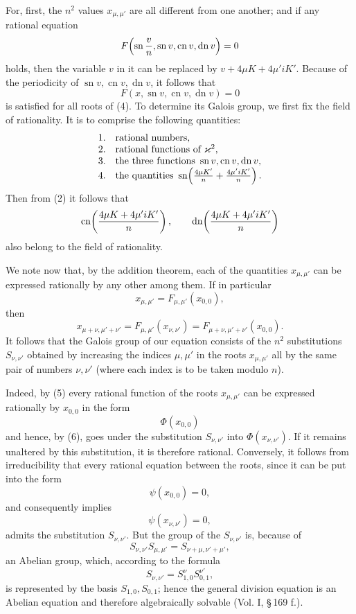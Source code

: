 \documentclass[11pt]{article}
\providecommand{\sn}{\operatorname{sn}}
\providecommand{\cn}{\operatorname{cn}}
\providecommand{\dn}{\operatorname{dn}}
\begin{document}
For, first, the $n^2$ values $x_{\mu,\mu'}$ are all different from one another; and if any
rational equation
\[
F\!\left(\sn {v\over n},\sn v,\cn v,\dn v\right)=0
\]
holds, then the variable $v$ in it can be replaced by $v+4\mu K+4\mu'iK'$. Because of the
periodicity of $\sn v,\cn v,\dn v$, it follows that
\[
F(x,\sn v,\cn v,\dn v)=0
\]
is satisfied for all roots of (4). To determine its Galois group, we first fix the field of
rationality. It is to comprise the following quantities:
\[
\begin{array}{ll}
1.& \text{rational numbers,}\\
2.& \text{rational functions of }\varkappa^2,\\
3.& \text{the three functions }\sn v,\cn v,\dn v,\\
4.& \text{the quantities }\sn\!\left({4\mu K'\over n}+{4\mu'iK'\over n}\right).
\end{array}
\]
Then from (2) it follows that
\[
\cn\!\left({4\mu K+4\mu'iK'\over n}\right),\qquad
\dn\!\left({4\mu K+4\mu'iK'\over n}\right)
\]
also belong to the field of rationality.

We note now that, by the addition theorem, each of the quantities $x_{\mu,\mu'}$ can be
expressed rationally by any other among them. If in particular
\begin{equation}
x_{\mu,\mu'}=F_{\mu,\mu'}(x_{0,0}),
\tag{5}
\end{equation}
then
\begin{equation}
x_{\mu+\nu,\mu'+\nu'}=F_{\mu,\mu'}(x_{\nu,\nu'})
=F_{\mu+\nu,\mu'+\nu'}(x_{0,0}).
\tag{6}
\end{equation}
It follows that the Galois group of our equation consists of the $n^2$ substitutions
$S_{\nu,\nu'}$ obtained by increasing the indices $\mu,\mu'$ in the roots $x_{\mu,\mu'}$
all by the same pair of numbers $\nu,\nu'$ (where each index is to be taken modulo $n$).

Indeed, by (5) every rational function of the roots $x_{\mu,\mu'}$ can be expressed
rationally by $x_{0,0}$ in the form
\[
\Phi(x_{0,0})
\]
and hence, by (6), goes under the substitution $S_{\nu,\nu'}$ into $\Phi(x_{\nu,\nu'})$.
If it remains unaltered by this substitution, it is therefore rational. Conversely, it follows
from irreducibility that every rational equation between the roots, since it can be put into
the form
\[
\psi(x_{0,0})=0,
\]
and consequently implies
\[
\psi(x_{\nu,\nu'})=0,
\]
admits the substitution $S_{\nu,\nu'}$. But the group of the $S_{\nu,\nu'}$ is, because of
\[
S_{\nu,\nu'}S_{\mu,\mu'}=S_{\nu+\mu,\nu'+\mu'},
\]
an Abelian group, which, according to the formula
\[
S_{\nu,\nu'}=S_{1,0}^{\nu}S_{0,1}^{\nu'},
\]
is represented by the basis $S_{1,0},S_{0,1}$; hence the general division equation is an
Abelian equation and therefore algebraically solvable (Vol. I, \S\,169 f.).
\end{document}
